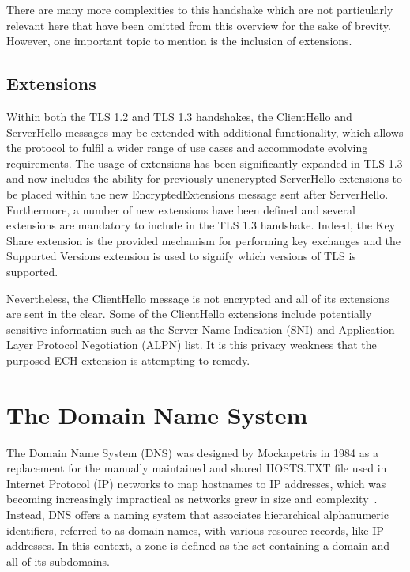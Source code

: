 There are many more complexities to this handshake which are not particularly relevant here that have been omitted from this overview for the sake of brevity. However, one important topic to mention is the inclusion of extensions.

\subsection{Extensions}

Within both the TLS 1.2 and TLS 1.3 handshakes, the ClientHello and ServerHello messages may be extended with additional functionality, which allows the protocol to fulfil a wider range of use cases and accommodate evolving requirements. The usage of extensions has been significantly expanded in TLS 1.3 and now includes the ability for previously unencrypted ServerHello extensions to be placed within the new EncryptedExtensions message sent after ServerHello. Furthermore, a number of new extensions have been defined and several extensions are mandatory to include in the TLS 1.3 handshake. Indeed, the Key Share extension is the provided mechanism for performing key exchanges and the Supported Versions extension is used to signify which versions of TLS is supported.

Nevertheless, the ClientHello message is not encrypted and all of its extensions are sent in the clear. Some of the ClientHello extensions include potentially sensitive information such as the Server Name Indication (SNI) and Application Layer Protocol Negotiation (ALPN) list. It is this privacy weakness that the purposed ECH extension is attempting to remedy.









\section{The Domain Name System}

The Domain Name System (DNS) was designed by Mockapetris in 1984 as a replacement for the manually maintained and shared HOSTS.TXT file used in Internet Protocol (IP) networks to map hostnames to IP addresses, which was becoming increasingly impractical as networks grew in size and complexity~\cite{rfc1034, rfc1035}. Instead, DNS offers a naming system that associates hierarchical alphanumeric identifiers, referred to as domain names, with various resource records, like IP addresses. In this context, a zone is defined as the set containing a domain and all of its subdomains.

